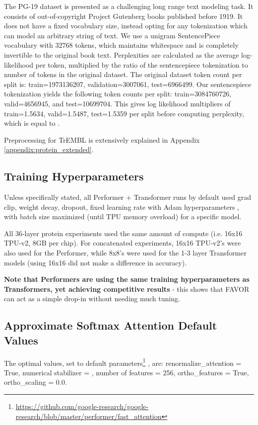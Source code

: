 The PG-19 dataset \citep{compr} is presented as a challenging long range text modeling task. It consists of out-of-copyright Project Gutenberg books published before 1919. It does not have a fixed vocabulary size, instead opting for any tokenization which can model an arbitrary string of text. We use a unigram SentencePiece vocabulary \citep{sentencepiece} with 32768 tokens, which maintains whitespace and is completely invertible to the original book text. Perplexities are calculated as the average log-likelihood per token, multiplied by the ratio of the sentencepiece tokenization to number of tokens in the original dataset. The original dataset token count per split is: train=1973136207, validation=3007061, test=6966499. Our sentencepiece tokenization yields the following token counts per split: train=3084760726, valid=4656945, and test=10699704. This gives log likelihood multipliers of train=1.5634, valid=1.5487, test=1.5359 per split before computing perplexity, which is equal to .

Preprocessing for TrEMBL is extensively explained in Appendix \ref{appendix:protein_extended}.

\subsection{Training Hyperparameters} 
Unless specifically stated, all Performer + Transformer runs by default used  grad clip,  weight decay,  dropout,  fixed learning rate with Adam hyperparameters , with batch size maximized (until TPU memory overload) for a specific model. 

All 36-layer protein experiments used the same amount of compute (i.e. 16x16 TPU-v2, 8GB per chip). For concatenated experiments, 16x16 TPU-v2's were also used for the Performer, while 8x8's were used for the 1-3 layer  Transformer models (using 16x16 did not make a difference in accuracy).

\textbf{Note that Performers are using the same training hyperparameters as Transformers, yet achieving competitive results} - this shows that FAVOR can act as a simple drop-in without needing much tuning.

\subsection{Approximate Softmax Attention Default Values} The optimal values, set to default parameters\footnote{\url{https://github.com/google-research/google-research/blob/master/performer/fast_attention}}
, are: renormalize\_attention = True, numerical stabilizer = , number of features = 256, ortho\_features = True, ortho\_scaling = 0.0.

